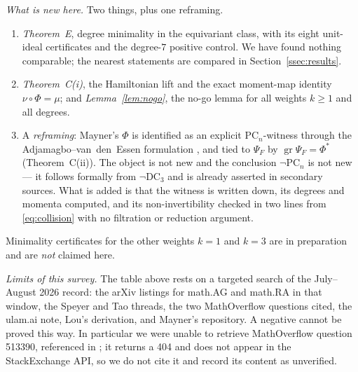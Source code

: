 \documentclass[11pt]{amsart}
\newcommand{\gr}{\operatorname{gr}}
\newcommand{\DC}{\mathrm{DC}}
\newcommand{\PC}{\mathrm{PC}}
\theoremstyle{plain}
\theoremstyle{definition}
\theoremstyle{remark}
\begin{document}
\emph{What is new here.} Two things, plus one reframing.
\begin{enumerate}
\item[(a)] \emph{Theorem~E}, degree minimality in the equivariant class,
with its eight unit-ideal certificates and the degree-$7$ positive
control. We have found nothing comparable; the nearest statements are
compared in Section~\ref{ssec:results}.
\item[(b)] \emph{Theorem~C(i)}, the Hamiltonian lift and the exact
moment-map identity $\nu\circ\Phi=\mu$; and \emph{Lemma~\ref{lem:nogo}},
the no-go lemma for all weights $k\ge1$ and all degrees.
\item[(c)] A \emph{reframing}: Mayner's $\Phi$ is identified as an
explicit $\PC_{n}$-witness through the Adjamagbo--van~den~Essen
formulation \cite{AvdE07}, and tied to $\Psi_{F}$ by
$\gr\Psi_{F}=\Phi^{*}$ (Theorem~C(ii)). The object is not new and the
conclusion $\neg\PC_{n}$ is not new --- it follows formally from
$\neg\DC_{3}$ and is already asserted in secondary sources. What is added
is that the witness is written down, its degrees and momenta computed, and
its non-invertibility checked in two lines from \eqref{eq:collision} with
no filtration or reduction argument.
\end{enumerate}
Minimality certificates for the other weights $k=1$ and $k=3$ are in
preparation and are \emph{not} claimed here.

\emph{Limits of this survey.} The table above rests on a targeted search
of the July--August 2026 record: the arXiv listings for math.AG and
math.RA in that window, the Speyer and Tao threads, the two MathOverflow
questions cited, the ulam.ai note, Lou's derivation, and Mayner's
repository. A negative cannot be proved this way. In particular we were
unable to retrieve MathOverflow question 513390, referenced in
\cite[\S12]{Mayner26}; it returns a 404 and does not appear in the
StackExchange API, so we do not cite it and record its content as
unverified.
\end{document}
